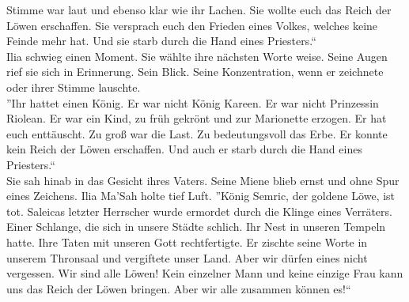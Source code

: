 Stimme war laut und ebenso klar wie ihr Lachen. Sie wollte euch das Reich der Löwen erschaffen. 
Sie versprach euch den Frieden eines Volkes, welches keine Feinde mehr hat. Und sie starb durch die 
Hand eines Priesters.``\\
Ilia schwieg einen Moment. Sie wählte ihre nächsten Worte weise. Seine Augen rief sie sich in 
Erinnerung. Sein Blick. Seine Konzentration, wenn er zeichnete oder ihrer Stimme lauschte.\\
''Ihr hattet einen König. Er war nicht König Kareen. Er war nicht Prinzessin Riolean. Er war ein 
Kind, zu früh gekrönt und zur Marionette erzogen. Er hat euch enttäuscht. Zu groß war die Last. Zu 
bedeutungsvoll das Erbe. Er konnte kein Reich der Löwen erschaffen. Und auch er starb durch die 
Hand eines Priesters.``\\
Sie sah hinab in das Gesicht ihres Vaters. Seine Miene blieb ernst und ohne Spur eines Zeichens. 
Ilia Ma'Sah holte tief Luft. ''König Semric, der goldene Löwe, ist tot. Saleicas letzter Herrscher 
wurde ermordet durch die Klinge eines Verräters. Einer Schlange, die sich in unsere Städte 
schlich. Ihr Nest in unseren Tempeln hatte. Ihre Taten mit unseren Gott rechtfertigte. Er 
zischte seine Worte in unserem Thronsaal und vergiftete unser Land. Aber wir dürfen eines 
nicht vergessen. Wir sind alle Löwen! Kein einzelner Mann und keine einzige Frau kann uns das Reich 
der Löwen bringen. Aber wir alle zusammen können es!``\\

